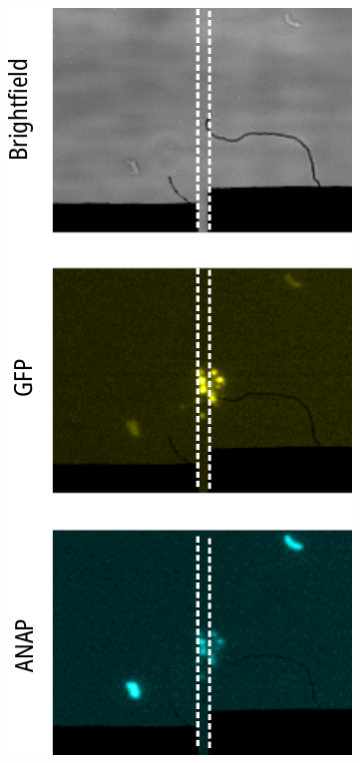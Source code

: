 \begin{figure}[h]
	\centering
	\begin{subfigure}[t]{0.3\textwidth}
		\caption{}\label{ch3fig:unroofed_images}
		\centering
		\includegraphics[width=\textwidth]{unroofed_images.pdf}

\end{subfigure}
\end{figure}
